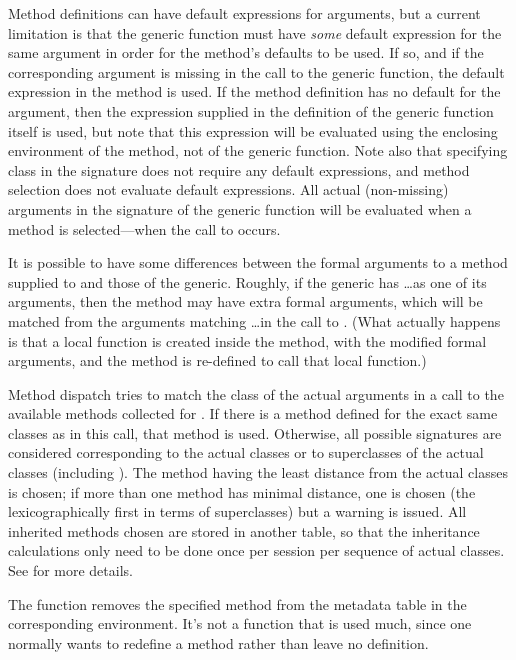 \begin{Details}
Method definitions can
have default expressions for arguments, but a current limitation is
that the generic function must have \emph{some} default expression for the
same argument in order for the method's defaults to be used.
If so, and if the corresponding argument is
missing in the call to the generic function, the default expression
in the method is used.  If the method definition has no default for
the argument, then the expression supplied in the definition of the
generic function itself is used, but note that this expression will
be evaluated using the enclosing environment of the method, not of
the generic function.
Note also that specifying class  in the signature
does not require any default expressions, and method selection does
not evaluate default expressions.
All actual (non-missing) arguments in the signature of the
generic function will be evaluated when a method is selected---when
the call to  occurs.

It is possible to have some differences between the
formal arguments to a method supplied to  and those
of the generic. Roughly, if the generic has \dots as one of its
arguments, then the method may have extra formal arguments, which
will be matched from the arguments matching \dots in the call to
.  (What actually happens is that a local function is
created inside the method, with the modified formal arguments, and the method
is re-defined to call that local function.)

Method dispatch tries to match the class of the actual arguments in a
call to the available methods collected for .  If there is a
method defined for the exact same classes as in this call, that
method is used.  Otherwise, all possible signatures are considered
corresponding to the actual classes or to superclasses of the actual
classes (including ).
The method having the least distance from the actual classes is
chosen; if more than one method has minimal distance, one is chosen
(the lexicographically first in terms of superclasses) but a warning
is issued.
All inherited methods chosen are stored in another table, so that
the inheritance calculations only need to be done once per session
per sequence of actual classes.
See
 for more details.

The function  removes the specified method from the
metadata table in the corresponding environment.
It's not a function that is used much, since one normally wants to
redefine a method rather than leave no definition.

\end{Details}
